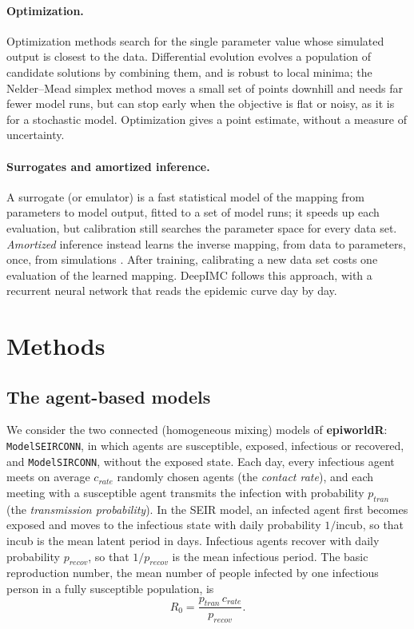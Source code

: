 \documentclass[12pt]{article}
\begin{document}
\paragraph{Optimization.} Optimization methods search for the single parameter value whose simulated
output is closest to the data. Differential evolution \autocite{storn1997differential} evolves a
population of candidate solutions by combining them, and is robust to local minima; the
Nelder--Mead simplex method \autocite{nelder1965simplex} moves a small set of points downhill and
needs far fewer model runs, but can stop early when the objective is flat or noisy, as it is for a
stochastic model. Optimization gives a point estimate, without a measure of uncertainty.

\paragraph{Surrogates and amortized inference.} A surrogate (or emulator) is a fast statistical
model of the mapping from parameters to model output, fitted to a set of model runs; it speeds up
each evaluation, but calibration still searches the parameter space for every data set.
\emph{Amortized} inference instead learns the inverse mapping, from data to parameters, once, from
simulations \autocite{cranmer2020frontier,radev2022bayesflow}. After training, calibrating a new data
set costs one evaluation of the learned mapping. DeepIMC follows this approach, with a recurrent
neural network that reads the epidemic curve day by day.

\section{Methods}\label{sec:methods}

\subsection{The agent-based models}\label{sec:models}

We consider the two connected (homogeneous mixing) models of \textbf{epiworldR}:
\texttt{ModelSEIRCONN}, in which agents are susceptible, exposed, infectious or recovered, and
\texttt{ModelSIRCONN}, without the exposed state. Each day, every infectious agent meets on average
$c_{rate}$ randomly chosen agents (the \emph{contact rate}), and each meeting with a susceptible
agent transmits the infection with probability $p_{tran}$ (the \emph{transmission probability}).
In the SEIR model, an infected agent first becomes exposed and moves to the infectious state with
daily probability $1/\text{incub}$, so that incub is the mean latent period in days. Infectious
agents recover with daily probability $p_{recov}$, so that $1/p_{recov}$ is the mean infectious
period. The basic reproduction number, the mean number of people infected by one infectious person
in a fully susceptible population, is
\begin{equation}\label{eq:R0}
R_0 = \frac{p_{tran}\, c_{rate}}{p_{recov}}.
\end{equation}
\end{document}
